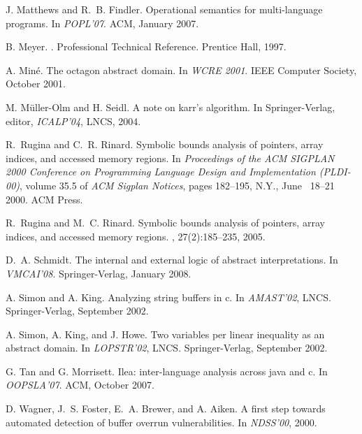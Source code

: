 \documentclass[10pt]{sigplanconf}
\begin{document}
\begin{thebibliography}{10}
J{.} Matthews and R{.}~B{.} Findler.
\newblock Operational semantics for multi-language programs.
\newblock In {\em POPL'07}. ACM, January 2007.

\vfill\eject

B{.} Meyer.
.
\newblock Professional Technical Reference. Prentice Hall, 1997.

A{.} Min\'e.
\newblock The octagon abstract domain.
\newblock In {\em WCRE 2001}. IEEE Computer Society, October 2001.

M{.} M{\"u}ller-Olm and H{.} Seidl.
\newblock A note on karr's algorithm.
\newblock In Springer-Verlag, editor, {\em ICALP'04}, LNCS, 2004.

R.~Rugina and C.~R. Rinard.
\newblock Symbolic bounds analysis of pointers, array indices, and accessed
  memory regions.
\newblock In {\em Proceedings of the {ACM} {SIGPLAN} 2000 Conference on
  Programming Language Design and Implementation ({PLDI}-00)}, volume 35.5 of
  {\em ACM Sigplan Notices}, pages 182--195, N.Y., June ~18--21 2000. ACM
  Press.

R.~Rugina and M.~C. Rinard.
\newblock Symbolic bounds analysis of pointers, array indices, and accessed
  memory regions.
,
  27(2):185--235, 2005.

D{.}~A{.} Schmidt.
\newblock The internal and external logic of abstract interpretations.
\newblock In {\em VMCAI'08}. Springer-Verlag, January 2008.

A{.} Simon and A{.} King.
\newblock Analyzing string buffers in c.
\newblock In {\em AMAST'02}, LNCS. Springer-Verlag, September 2002.

A{.} Simon, A{.} King, and J{.} Howe.
\newblock Two variables per linear inequality as an abstract domain.
\newblock In {\em LOPSTR'02}, LNCS. Springer-Verlag, September 2002.

G{.} Tan and G{.} Morrisett.
\newblock Ilea: inter-language analysis across java and c.
\newblock In {\em OOPSLA'07}. ACM, October 2007.

D{.} Wagner, J{.}~S{.} Foster, E{.}~A{.} Brewer, and A{.} Aiken.
\newblock A first step towards automated detection of buffer overrun
  vulnerabilities.
\newblock In {\em NDSS'00}, 2000.

\end{thebibliography}
\end{document}
